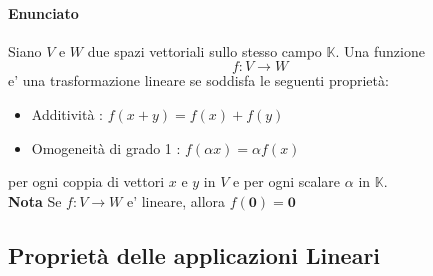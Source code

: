 \documentclass[a4paper, 10pt]{article}
\begin{document}
	\paragraph*{Enunciato} Siano $V$ e $W$ due spazi vettoriali sullo stesso campo $\mathbb{K}$. Una funzione 
	\[ f : V \rightarrow W \] e' una trasformazione lineare se soddisfa le seguenti proprietà:
	\begin{itemize}
		\item Additività : $f(x + y) = f(x) + f(y)$
		\item Omogeneità di grado 1 : $f(\alpha x) = \alpha f(x)$
	\end{itemize}
	per ogni coppia di vettori $x$ e $y$ in $V$ e per ogni scalare $\alpha$ in $\mathbb{K}$. \\
	\textbf{Nota} Se $f : V \rightarrow W$ e' lineare, allora $f(\textbf{0}) = \textbf{0}$ 
	
	\subsection{Proprietà delle applicazioni Lineari}
	
\end{document}
